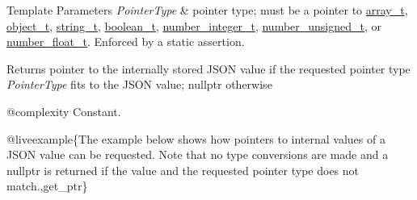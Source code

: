 \begin{DoxyTemplParams}{Template Parameters}
{\em Pointer\+Type} & pointer type; must be a pointer to \mbox{\hyperlink{classnlohmann_1_1basic__json_ae095578e03df97c5b3991787f1056374}{array\+\_\+t}}, \mbox{\hyperlink{classnlohmann_1_1basic__json_aa1eb13d5aa86f80cbee6c58e90fbaf49}{object\+\_\+t}}, \mbox{\hyperlink{classnlohmann_1_1basic__json_a61f8566a1a85a424c7266fb531dca005}{string\+\_\+t}}, \mbox{\hyperlink{classnlohmann_1_1basic__json_a4c919102a9b4fe0d588af64801436082}{boolean\+\_\+t}}, \mbox{\hyperlink{classnlohmann_1_1basic__json_a98e611d67b7bd75307de99c9358ab2dc}{number\+\_\+integer\+\_\+t}}, \mbox{\hyperlink{classnlohmann_1_1basic__json_ab906e29b5d83ac162e823ada2156b989}{number\+\_\+unsigned\+\_\+t}}, or \mbox{\hyperlink{classnlohmann_1_1basic__json_a88d6103cb3620410b35200ee8e313d97}{number\+\_\+float\+\_\+t}}. Enforced by a static assertion.\\
\hline
\end{DoxyTemplParams}
\begin{DoxyReturn}{Returns}
pointer to the internally stored J\+S\+ON value if the requested pointer type {\itshape Pointer\+Type} fits to the J\+S\+ON value; {\ttfamily nullptr} otherwise
\end{DoxyReturn}
@complexity Constant.

@liveexample\{The example below shows how pointers to internal values of a J\+S\+ON value can be requested. Note that no type conversions are made and a {\ttfamily nullptr} is returned if the value and the requested pointer type does not match.,get\+\_\+ptr\}

